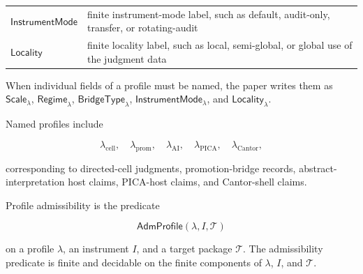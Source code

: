 \documentclass[11pt]{article}
\theoremstyle{definition}
\begin{document}
\begin{longtable}[]{@{}ll@{}}
\begin{minipage}[t]{0.47\columnwidth}\raggedright
\(\mathsf{InstrumentMode}\)\strut
\end{minipage} & \begin{minipage}[t]{0.47\columnwidth}\raggedright
finite instrument-mode label, such as default, audit-only, transfer, or rotating-audit\strut
\end{minipage}\tabularnewline
\begin{minipage}[t]{0.47\columnwidth}\raggedright
\(\mathsf{Locality}\)\strut
\end{minipage} & \begin{minipage}[t]{0.47\columnwidth}\raggedright
finite locality label, such as local, semi-global, or global use of the judgment data\strut
\end{minipage}\tabularnewline
\bottomrule
\end{longtable}

When individual fields of a profile must be named, the paper writes them as \(\mathsf{Scale}_{\lambda}\), \(\mathsf{Regime}_{\lambda}\), \(\mathsf{BridgeType}_{\lambda}\), \(\mathsf{InstrumentMode}_{\lambda}\), and \(\mathsf{Locality}_{\lambda}\).

Named profiles include

\[
\lambda_{\mathrm{cell}},\quad\lambda_{\mathrm{prom}},\quad\lambda_{\mathrm{AI}},\quad\lambda_{\mathrm{PICA}},\quad\lambda_{\mathrm{Cantor}},
\]

corresponding to directed-cell judgments, promotion-bridge records, abstract-interpretation host claims, PICA-host claims, and Cantor-shell claims.

Profile admissibility is the predicate

\[
\mathsf{AdmProfile}(\lambda,I,\mathcal T)
\]

on a profile \(\lambda\), an instrument \(I\), and a target package \(\mathcal T\). The admissibility predicate is finite and decidable on the finite components of \(\lambda\), \(I\), and \(\mathcal T\).
\end{document}
